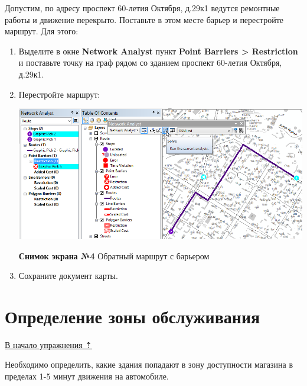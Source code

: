 \documentclass[]{book}
\theoremstyle{definition}
\theoremstyle{definition}
\theoremstyle{definition}
\theoremstyle{remark}
\begin{document}
Допустим, по адресу проспект 60-летия Октября, д.29к1 ведутся ремонтные
работы и движение перекрыто. Поставьте в этом месте барьер и перестройте
маршрут. Для этого:

\begin{enumerate}
\def\labelenumi{\arabic{enumi}.}
\item
  Выделите в окне \textbf{Network Analyst} пункт \textbf{Point Barriers
  \textgreater{} Restriction} и поставьте точку на граф рядом со зданием
  проспект 60-летия Октября, д.29к1.
\item
  Перестройте маршрут:

  \includegraphics{images/Ex12/image13.png}

  \textbf{Снимок экрана №4} Обратный маршрут с барьером
\item
  Сохраните документ карты.
\end{enumerate}

\hypertarget{network-analysis-servicearea}{%
\section{Определение зоны
обслуживания}\label{network-analysis-servicearea}}

\protect\hyperlink{network-analysis}{В начало упражнения ⇡}

Необходимо определить, какие здания попадают в зону доступности магазина
в пределах 1-5 минут движения на автомобиле.
\end{document}
